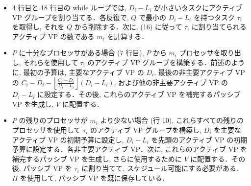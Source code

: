 \begin{frame}{}
    \begin{itemize}
        \item 4 行目と 18 行目の while ループでは, $D_{i}-L_{i}$ が小さいタスクにアクティブ VP グループを割り当てる．各反復で, $Q$ で最小の $D_{i}-L_{i}$ を持つタスク $\tau_{i}$ を取得し, それを $Q$ から削除する．次に, (16) に従って $\tau_{i}$ に割り当てられるアクティブ VP の数である $m_{i}$ を計算する．
    \end{itemize}
\end{frame}

\begin{frame}{}
    \begin{itemize}
        \item $P$ に十分なプロセッサがある場合 (7 行目), $P$ から $m_{i}$ プロセッサを取り出し, それらを使用して $\tau_{i}$ のアクティブ VP グループを構築する．前述のように, 最初の予算は, 主要なアクティブ VP の $D_{i}$, 最後の非主要アクティブ VP の $C_{i}-D_{i}-\left\lfloor\frac{C_{i}-D_{i}}{D_{i}-L_{i}}\right\rfloor\left(D_{i}-L_{i}\right)$, および他の非主要アクティブ VP の $D_{i}-L_{i}$ に設定する．その後, これらのアクティブ VP を補完するパッシブ VP を生成し, $V$ に配置する．
    \end{itemize}
\end{frame}

\begin{frame}{}
    \begin{itemize}
        \item $P$ の残りのプロセッサが $m_{i}$ より少ない場合 (行 10), これらすべての残りのプロセッサを使用して $\tau_{i}$ のアクティブ VP グループを構築し, $D_{i}$ を主要なアクティブ VP の初期予算に設定し, $D_{i}-L_{i}$ を先頭のアクティブ VP の初期予算に設定する．各非主要アクティブ VP．次に, これらのアクティブ VP を補完するパッシブ VP を生成し, さらに使用するために $V$ に配置する．その後, パッシブ VP を $\tau_{i}$ に割り当てて, スケジュール可能にする必要がある． $\Pi$ を使用して, パッシブ VP を既に保存している．
    \end{itemize}
\end{frame}

